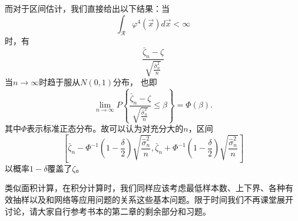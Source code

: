 而对于区间估计，我们直接给出以下结果：当
\begin{equation}
  \int_{\mathscr{R}} \varphi^4(\vec{x}) d\vec{x} < \infty
\end{equation}
时，有
$$
\frac{\bar{\zeta}_n - \zeta}{\sqrt{\frac{\hat{\sigma}^2_n}{n}}}
$$
当$n \to \infty$时趋于服从$N(0, 1)$分布， 也即
\begin{equation}
  \lim_{n \to \infty} P\left\{\frac{\bar{\zeta}_n - \zeta}{\sqrt{\frac{\hat{\sigma}^2_n}{n}}} \leq \beta\right\} = \Phi(\beta).
\end{equation}
其中$\Phi$表示标准正态分布。故可以认为对充分大的$n$，区间
\begin{equation}
  \left[\bar{\zeta}_n - \Phi^{-1}\left(1 - \frac{\delta}{2}\right)\sqrt{\frac{\hat{\sigma}^2_n}{n}},
    \bar{\zeta}_n + \Phi^{-1}\left(1 - \frac{\delta}{2}\right)\sqrt{\frac{\hat{\sigma}^2_n}{n}}\right]
\end{equation}
以概率$1 - \delta$覆盖了$\zeta$。

类似面积计算，在积分计算时，我们同样应该考虑最低样本数、上下界、各种有
效抽样以及和网络等应用问题的关系这些基本问题。限于时间我们不再课堂展开
讨论，请大家自行参考书本的第二章的剩余部分和习题。
